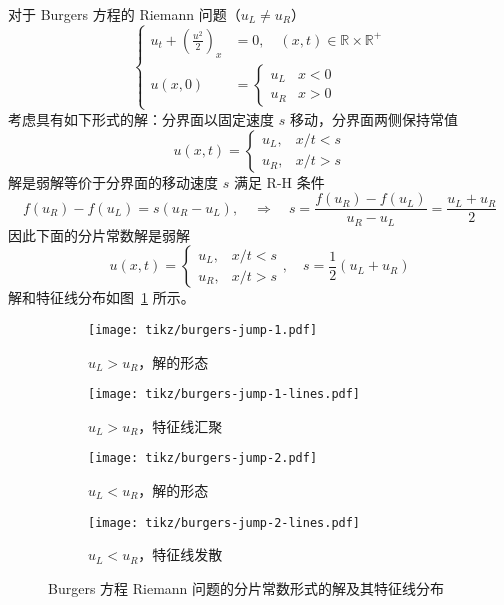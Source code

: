 \begin{example}\label{eg:burgers-riemann-jump}
    对于 Burgers 方程的 Riemann 问题（$u_L \neq u_R$）
    \[
        \left\{
        \begin{aligned}
            u_t + \left(\frac{u^2}2\right)_x & = 0,\quad (x,t) \in \mathbb{R} \times  \mathbb{R}^+ \\
            u(x,0)                           & =
            \begin{cases}
                u_L & x < 0 \\
                u_R & x > 0
            \end{cases}
        \end{aligned}
        \right.
    \]
    考虑具有如下形式的解：分界面以固定速度 $s$ 移动，分界面两侧保持常值
    \[
        u(x,t) =
        \begin{cases}
            u_L, & x/t < s \\
            u_R, & x/t > s
        \end{cases}
    \]
    解是弱解等价于分界面的移动速度 $s$ 满足 R-H 条件
    \[
        f(u_R)-f(u_L) = s (u_R - u_L),
        \quad \Rightarrow \quad
        s = \frac{f(u_R)-f(u_L)}{u_R - u_L} = \frac{u_L + u_R}{2}
    \]
    因此下面的分片常数解是弱解
    \[
        u(x,t) =
        \begin{cases}
            u_L, & x/t < s \\
            u_R, & x/t > s
        \end{cases},\quad s = \frac12(u_L + u_R)
    \]
    解和特征线分布如图~\ref{fig:burgers-riemann-jump} 所示。
\end{example}

\begin{figure}[htbp]
    \centering
    \begin{subfigure}[b]{0.47\textwidth}
        \centering
        \texttt{[image: tikz/burgers-jump-1.pdf]}
        \caption{$u_L > u_R$，解的形态}
    \end{subfigure}
    \begin{subfigure}[b]{0.47\textwidth}
        \centering
        \texttt{[image: tikz/burgers-jump-1-lines.pdf]}
        \caption{$u_L > u_R$，特征线汇聚}
    \end{subfigure}
    \begin{subfigure}[b]{0.47\textwidth}
        \centering
        \texttt{[image: tikz/burgers-jump-2.pdf]}
        \caption{$u_L < u_R$，解的形态}
    \end{subfigure}
    \begin{subfigure}[b]{0.47\textwidth}
        \centering
        \texttt{[image: tikz/burgers-jump-2-lines.pdf]}
        \caption{$u_L < u_R$，特征线发散}
    \end{subfigure}
    \caption{Burgers 方程 Riemann 问题的分片常数形式的解及其特征线分布}
    \label{fig:burgers-riemann-jump}
\end{figure}


